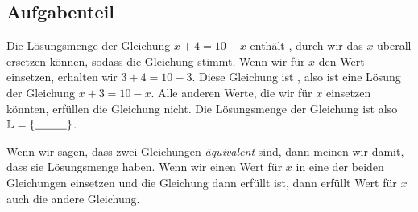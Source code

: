 \documentclass[]{uebungsblatt}
\begin{document}
\subsection*{Aufgabenteil}
%
\begin{exercise}
    Die Lösungsmenge der Gleichung $x+4=10-x$ enthält , durch  wir das $x$ überall ersetzen können, sodass die Gleichung stimmt. Wenn wir für $x$ den Wert  einsetzen, erhalten wir $3+4=10-3$. Diese Gleichung ist , also ist  eine Lösung der Gleichung $x+3=10-x$. Alle anderen Werte, die wir für $x$ einsetzen könnten, erfüllen die Gleichung nicht. Die Lösungsmenge der Gleichung ist also $\Solutions=\{\answerfield{1cm}{3}\}$.
\end{exercise}
\begin{exercise}
    Wenn wir sagen, dass zwei Gleichungen \emph{äquivalent} sind, dann meinen wir damit, dass sie  Lösungsmenge haben. Wenn wir einen Wert für $x$ in eine der beiden Gleichungen einsetzen und die Gleichung dann erfüllt ist, dann erfüllt  Wert für $x$ auch die andere Gleichung.
\end{exercise}
\end{document}
